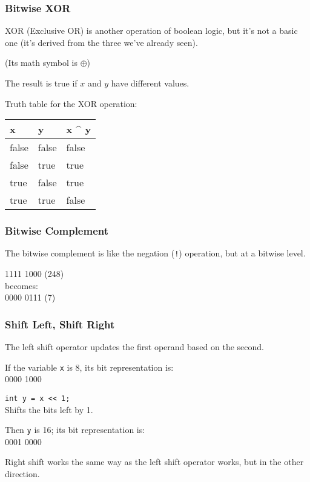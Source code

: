 \begin{frame}
\frametitle{Bitwise XOR}
XOR (Exclusive OR) is another operation of boolean logic, but it's not a basic one (it's derived from the three we've already seen).

(Its math symbol is $\oplus$)

The result is true if $x$ and $y$ have different values.

Truth table for the XOR operation:

\begin{center}
\begin{tabular}{l|l|l}
	\textbf{x} & \textbf{y} & \textbf{x \^{} y}\\ \hline
	false & false & false \\ \hline
	false & true & true \\ \hline
	true & false & true \\ \hline
	true & true & false \\ 
\end{tabular}
\end{center}

\end{frame}

\begin{frame}
\frametitle{Bitwise Complement}

The bitwise complement is like the negation (\texttt{!}) operation, but at a bitwise level.

1111 1000 (248)\\
becomes:\\
0000 0111 (7)\\

\end{frame}

\begin{frame}
\frametitle{Shift Left, Shift Right}
The left shift operator updates the first operand based on the second.

If the variable \texttt{x} is 8, its bit representation is:\\
0000 1000

\texttt{int y = x << 1;}\\
Shifts the bits left by 1.

Then \texttt{y} is 16; its bit representation is:\\
0001 0000

Right shift works the same way as the left shift operator works, but in the other direction.

\end{frame}

